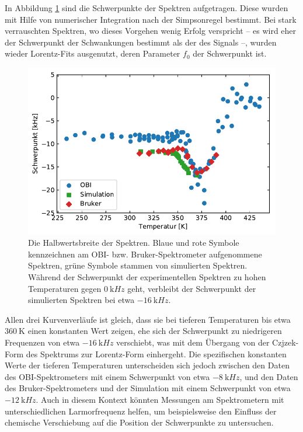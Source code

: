 In Abbildung \ref{fig:res:spek_mean} sind die Schwerpunkte der Spektren aufgetragen. Diese wurden mit Hilfe von numerischer Integration nach der Simpsonregel bestimmt. Bei stark verrauschten Spektren, wo dieses Vorgehen wenig Erfolg verspricht -- es wird eher der Schwerpunkt der Schwankungen bestimmt als der des Signals --, wurden wieder Lorentz-Fits ausgenutzt, deren Parameter $f_0$ der Schwerpunkt ist.
\begin{figure}
	\begin{center}
		\includegraphics[width=.9\textwidth]{graphics/plot/mean.pdf} 
	\end{center}
	\caption{Die Halbwertsbreite der Spektren. Blaue und rote Symbole kennzeichnen am OBI- bzw. Bruker-Spektrometer aufgenommene Spektren, grüne Symbole stammen von simulierten Spektren. Während der Schwerpunkt der experimentellen Spektren zu hohen Temperaturen gegen $\SI{0}{\kilo Hz}$ geht, verbleibt der Schwerpunkt der simulierten Spektren bei etwa $\SI{-16}{\kilo Hz}$.} \label{fig:res:spek_mean}
\end{figure}

Allen drei Kurvenverläufe ist gleich, dass sie bei tieferen Temperaturen bis etwa $\SI{360}{\kelvin}$ einen konstanten Wert zeigen, ehe sich der Schwerpunkt zu niedrigeren Frequenzen von etwa $\SI{-16}{\kilo Hz}$ verschiebt, was mit dem Übergang von der Czjzek-Form des Spektrums zur Lorentz-Form einhergeht. Die spezifischen konstanten Werte der tieferen Temperaturen unterscheiden sich jedoch zwischen den Daten des OBI-Spektrometers mit einem Schwerpunkt von etwa $\SI{-8}{\kilo Hz}$, und den Daten des Bruker-Spektrometers und der Simulation mit einem Schwerpunkt von etwa $\SI{-12}{\kilo Hz}$. Auch in diesem Kontext könnten Messungen am Spektrometern mit unterschiedlichen Larmorfrequenz helfen, um beispielsweise den Einfluss der chemische Verschiebung auf die Position der Schwerpunkte zu untersuchen.

